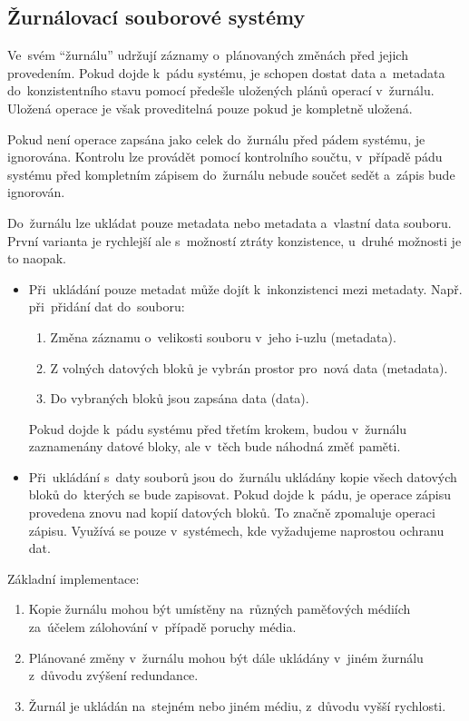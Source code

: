\subsection{Žurnálovací souborové systémy}

Ve~svém \enquote{žurnálu} udržují záznamy o~plánovaných změnách před jejich provedením. Pokud dojde k~pádu systému, je schopen dostat data a~metadata do~konzistentního stavu pomocí předešle uložených plánů operací v~žurnálu. Uložená operace je však proveditelná pouze pokud je kompletně uložená.

Pokud není operace zapsána jako celek do~žurnálu před pádem systému, je ignorována. Kontrolu lze provádět pomocí kontrolního součtu, v~případě pádu systému před kompletním zápisem do~žurnálu nebude součet sedět a~zápis bude ignorován.

Do~žurnálu lze ukládat pouze metadata nebo metadata a~vlastní data souboru. První varianta je rychlejší ale s~možností ztráty konzistence, u~druhé možnosti je to naopak.

\begin{itemize}
	\item Při~ukládání pouze metadat může dojít k~inkonzistenci mezi metadaty. Např. při~přidání dat do~souboru:
	\begin{enumerate}
		\item Změna záznamu o~velikosti souboru v~jeho i-uzlu (metadata).
		\item Z volných datových bloků je vybrán prostor pro~nová data (metadata).
		\item Do vybraných bloků jsou zapsána data (data).
	\end{enumerate}
	Pokud dojde k~pádu systému před třetím krokem, budou v~žurnálu zaznamenány datové bloky, ale v~těch bude náhodná změť paměti.
	\item Při~ukládání s~daty souborů jsou do~žurnálu ukládány kopie všech datových bloků do~kterých se bude zapisovat. Pokud dojde k~pádu, je operace zápisu provedena znovu nad kopií datových bloků. To značně zpomaluje operaci zápisu. Využívá se pouze v~systémech, kde vyžadujeme naprostou ochranu dat.
\end{itemize}

Základní implementace:

\begin{enumerate}
	\item Kopie žurnálu mohou být umístěny na~různých paměťových médiích za~účelem zálohování v~případě poruchy média.
	\item Plánované změny v~žurnálu mohou být dále ukládány v~jiném žurnálu z~důvodu zvýšení redundance.
	\item Žurnál je ukládán na~stejném nebo jiném médiu, z~důvodu vyšší rychlosti.
\end{enumerate}

